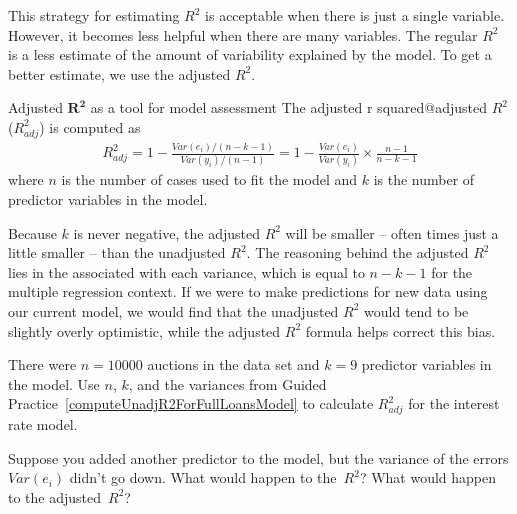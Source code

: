 This strategy for estimating $R^2$ is acceptable when there
is just a single variable.
However, it becomes less helpful when there are many
variables.
The regular $R^2$ is a less estimate of the amount of
variability explained by the model.
To get a better estimate, we use the adjusted $R^2$.

\begin{onebox}{Adjusted $\mathbf{R^2}$ as a tool for
    model assessment}
  The 
      {adjusted r squared@adjusted $R^2$ ($R_{adj}^2$)}
  is computed as
  \begin{align*}
  R_{adj}^{2} = 1-\frac{Var(e_i) / (n-k-1)}{Var(y_i) / (n-1)}
      = 1-\frac{Var(e_i)}{Var(y_i)} \times \frac{n-1}{n-k-1}
  \end{align*}
  where $n$ is the number of cases used to fit the model
  and $k$ is the number of predictor variables in the model.
\end{onebox}

Because $k$ is never negative, the adjusted $R^2$ will be
smaller -- often times just a little smaller -- than the
unadjusted $R^2$.
The reasoning behind the adjusted $R^2$ lies in the
associated with each variance,
which is equal to $n - k - 1$ for the multiple regression
context.
If we were to make predictions for new data
using our current model, we would find that the unadjusted
$R^2$ would tend to be slightly overly optimistic, while
the adjusted $R^2$ formula helps correct this bias.

\begin{exercisewrap}
\begin{nexercise}
There were $n=10000$ auctions in the  data set
and $k=9$ predictor variables in the model.
Use $n$, $k$, and the variances from
Guided Practice~\ref{computeUnadjR2ForFullLoansModel}
to calculate $R_{adj}^2$ for the interest rate
model.\footnotemark
\end{nexercise}
\end{exercisewrap}

\begin{exercisewrap}
\begin{nexercise}
Suppose you added another predictor to the model, but the
variance of the errors $Var(e_i)$ didn't go down.
What would happen to the~$R^2$?
What would happen to the
adjusted~$R^2$?\hspace{0.7mm}\footnotemark
\end{nexercise}
\end{exercisewrap}

